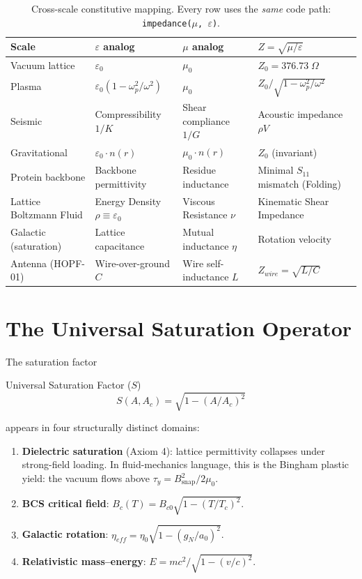 \begin{table}[H]
\centering\small
\caption{Cross-scale constitutive mapping.  Every row uses the
\textit{same} code path: \texttt{impedance($\mu$, $\varepsilon$)}.}
\label{tab:cross_scale}
\begin{tabular}{llll}
\toprule
\textbf{Scale} & \textbf{$\varepsilon$ analog}
  & \textbf{$\mu$ analog}
  & \textbf{$Z = \sqrt{\mu/\varepsilon}$} \\
\midrule
Vacuum lattice
  & $\varepsilon_0$
  & $\mu_0$
  & $Z_0 = 376.73\;\Omega$ \\
Plasma
  & $\varepsilon_0(1 - \omega_p^2/\omega^2)$
  & $\mu_0$
  & $Z_0/\sqrt{1-\omega_p^2/\omega^2}$ \\
Seismic
  & Compressibility $1/K$
  & Shear compliance $1/G$
  & Acoustic impedance $\rho V$ \\
Gravitational
  & $\varepsilon_0 \cdot n(r)$
  & $\mu_0 \cdot n(r)$
  & $Z_0$ (invariant) \\
Protein backbone
  & Backbone permittivity
  & Residue inductance
  & Minimal $S_{11}$ mismatch (Folding) \\
Lattice Boltzmann Fluid
  & Energy Density $\rho \equiv \varepsilon_0$
  & Viscous Resistance $\nu$
  & Kinematic Shear Impedance \\
Galactic (saturation)
  & Lattice capacitance
  & Mutual inductance $\eta$
  & Rotation velocity \\
Antenna (HOPF-01)
  & Wire-over-ground $C$
  & Wire self-inductance $L$
  & $Z_{wire} = \sqrt{L/C}$ \\
\bottomrule
\end{tabular}
\end{table}


\section{The Universal Saturation Operator}
\label{sec:universal_saturation}

The saturation factor
\begin{resultbox}{Universal Saturation Factor ($S$)}
\begin{equation}
    S(A, A_c) = \sqrt{1 - (A/A_c)^2}
    \label{eq:saturation_sigma}
\end{equation}
\end{resultbox}
appears in four structurally distinct domains:

\begin{enumerate}
    \item \textbf{Dielectric saturation} (Axiom 4): lattice permittivity
          collapses under strong-field loading.  In fluid-mechanics language,
          this is the Bingham plastic yield: the vacuum flows above
          $\tau_y = B_\text{snap}^2/2\mu_0$.
    \item \textbf{BCS critical field}: $B_c(T) = B_{c0}\sqrt{1-(T/T_c)^2}$.
    \item \textbf{Galactic rotation}: $\eta_{eff} = \eta_0\sqrt{1-(g_N/a_0)^2}$.
    \item \textbf{Relativistic mass--energy}: $E = mc^2/\sqrt{1-(v/c)^2}$.
\end{enumerate}

